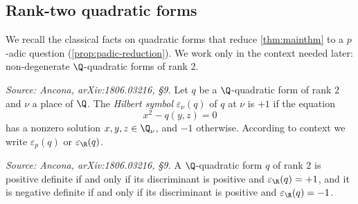 \subsection*{Rank-two quadratic forms}

We recall the classical facts on quadratic forms that reduce \cref{thm:mainthm}
to a \(p\)-adic question (\cref{prop:padic-reduction}). We work only in the
context needed later: non-degenerate \(\Q\)-quadratic forms of rank \(2\).

\begin{definition}
  \label{def:hilbert-symbol}
  \textit{Source: Ancona, arXiv:1806.03216, §9.}
  Let \(q\) be a \(\Q\)-quadratic form of rank \(2\) and \(\nu\) a place of
  \(\Q\). The \emph{Hilbert symbol} \(\varepsilon_\nu(q)\) of \(q\) at \(\nu\) is
  \(+1\) if the equation
  \[x^2 - q(y,z) = 0\]
  has a nonzero solution \(x, y, z \in \Q_\nu\), and \(-1\) otherwise. According
  to context we write \(\varepsilon_p(q)\) or \(\varepsilon_\R(q)\).
\end{definition}

\begin{remark}
  \label{rem:rank2-signature}
  \textit{Source: Ancona, arXiv:1806.03216, §9.}
  A \(\Q\)-quadratic form \(q\) of rank \(2\) is positive definite if and only
  if its discriminant is positive and \(\varepsilon_\R(q) = +1\), and it is
  negative definite if and only if its discriminant is positive and
  \(\varepsilon_\R(q) = -1\).
\end{remark}

